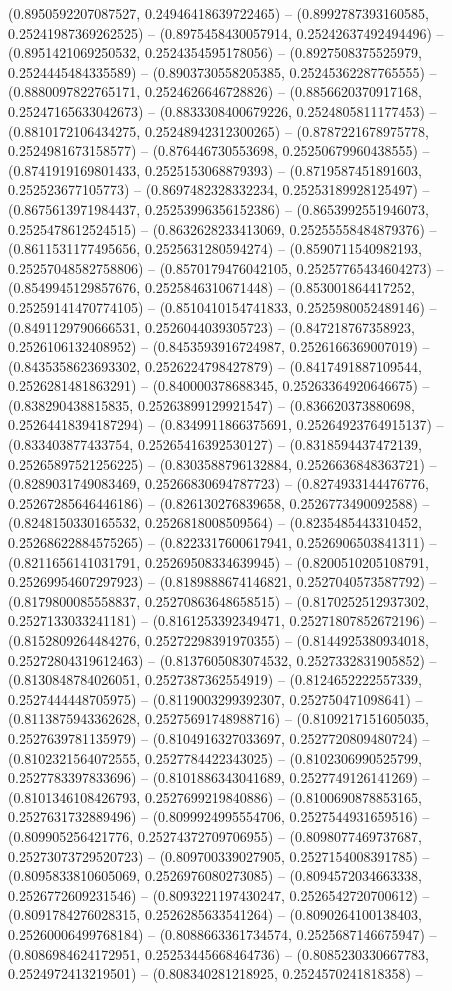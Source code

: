 (0.8950592207087527, 0.24946418639722465) -- (0.8992787393160585, 0.25241987369262525) -- (0.8975458430057914, 0.25242637492494496) -- (0.8951421069250532, 0.2524354595178056) -- (0.8927508375525979, 0.2524445484335589) -- (0.8903730558205385, 0.25245362287765555) -- (0.8880097822765171, 0.2524626646728826) -- (0.8856620370917168, 0.25247165633042673) -- (0.8833308400679226, 0.2524805811177453) -- (0.8810172106434275, 0.25248942312300265) -- (0.8787221678975778, 0.2524981673158577) -- (0.876446730553698, 0.25250679960438555) -- (0.8741919169801433, 0.2525153068879393) -- (0.8719587451891603, 0.252523677105773) -- (0.8697482328332234, 0.25253189928125497) -- (0.8675613971984437, 0.25253996356152386) -- (0.8653992551946073, 0.2525478612524515) -- (0.8632628233413069, 0.25255558484879376) -- (0.8611531177495656, 0.2525631280594274) -- (0.8590711540982193, 0.25257048582758806) -- (0.8570179476042105, 0.25257765434604273) -- (0.8549945129857676, 0.2525846310671448) -- (0.853001864417252, 0.25259141470774105) -- (0.8510410154741833, 0.2525980052489146) -- (0.8491129790666531, 0.2526044039305723) -- (0.847218767358923, 0.2526106132408952) -- (0.8453593916724987, 0.2526166369007019) -- (0.8435358623693302, 0.2526224798427879) -- (0.8417491887109544, 0.2526281481863291) -- (0.840000378688345, 0.25263364920646675) -- (0.838290438815835, 0.25263899129921547) -- (0.836620373880698, 0.25264418394187294) -- (0.8349911866375691, 0.25264923764915137) -- (0.833403877433754, 0.25265416392530127) -- (0.8318594437472139, 0.25265897521256225) -- (0.8303588796132884, 0.2526636848363721) -- (0.8289031749083469, 0.25266830694787723) -- (0.8274933144476776, 0.25267285646446186) -- (0.826130276839658, 0.2526773490092588) -- (0.8248150330165532, 0.2526818008509564) -- (0.8235485443310452, 0.25268622884575265) -- (0.8223317600617941, 0.2526906503841311) -- (0.8211656141031791, 0.25269508334639945) -- (0.8200510205108791, 0.25269954607297923) -- (0.8189888674146821, 0.2527040573587792) -- (0.8179800085558837, 0.25270863648658515) -- (0.8170252512937302, 0.2527133033241181) -- (0.8161253392349471, 0.25271807852672196) -- (0.8152809264484276, 0.25272298391970355) -- (0.8144925380934018, 0.25272804319612463) -- (0.8137605083074532, 0.2527332831905852) -- (0.8130848784026051, 0.2527387362554919) -- (0.8124652222557339, 0.2527444448705975) -- (0.8119003299392307, 0.252750471098641) -- (0.8113875943362628, 0.25275691748988716) -- (0.8109217151605035, 0.2527639781135979) -- (0.8104916327033697, 0.2527720809480724) -- (0.8102321564072555, 0.2527784422343025) -- (0.8102306990525799, 0.2527783397833696) -- (0.8101886343041689, 0.2527749126141269) -- (0.8101346108426793, 0.2527699219840886) -- (0.8100690878853165, 0.2527631732889496) -- (0.8099924995554706, 0.2527544931659516) -- (0.809905256421776, 0.25274372709706955) -- (0.8098077469737687, 0.25273073729520723) -- (0.809700339027905, 0.2527154008391785) -- (0.8095833810605069, 0.2526976080273085) -- (0.8094572034663338, 0.2526772609231546) -- (0.8093221197430247, 0.2526542720700612) -- (0.8091784276028315, 0.2526285633541264) -- (0.8090264100138403, 0.25260006499768184) -- (0.8088663361734574, 0.2525687146675947) -- (0.8086984624172951, 0.25253445668464736) -- (0.8085230330667783, 0.2524972413219501) -- (0.808340281218925, 0.2524570241818358) -- 